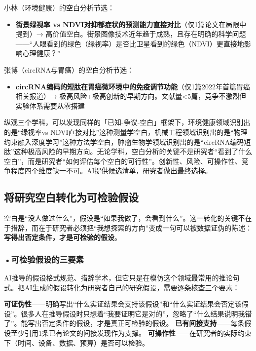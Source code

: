 小林（环境健康）的空白分析节选：

\begin{itemize}[nosep]
\item \textbf{街景绿视率 vs NDVI对抑郁症状的预测能力直接对比}（仅1篇论文在局限中提到）→ 高价值空白。街景图像技术近年趋于成熟，且存在明确的科学问题——``人眼看到的绿色（绿视率）是否比卫星看到的绿色（NDVI）更直接地影响心理健康？''
\end{itemize}

张博（circRNA与胃癌）的空白分析节选：

\begin{itemize}[nosep]
\item \textbf{circRNA编码的短肽在胃癌微环境中的免疫调节功能}（仅1篇2022年首篇胃癌相关报道）→ 极高风险+极高创新的早期方向。文献量<5篇，竞争不激烈但实验体系需要从零搭建
\end{itemize}

\smallskip
纵观三个学科，可以发现同样的「已知-争议-空白」框架下，环境健康领域识别出的是``绿视率vs NDVI直接对比''这种测量学空白，机械工程领域识别出的是``物理约束融入深度学习''这种方法学空白，肿瘤生物学领域识别出的是``circRNA编码短肽''这种极高风险的早期方向。无论学科，空白分析的关键不是研究者``看到了什么空白''，而是研究者``如何评估每个空白的可行性''。创新性、风险、可操作性、竞争程度四个维度缺一不可。AI提供候选清单，研究者做出最终选择。

\subsection{将研究空白转化为可检验假设}

空白是``没人做过什么''，假设是``如果我做了，会看到什么''。这一转化的关键不在于措辞，而在于研究者必须把``我想探索的方向''变成一句可以被数据证伪的陈述：\textbf{写得出否定条件，才是可检验的假设}。

\subsubsection*{\textbf{•可检验假设的三要素}}AI推导的假设格式规范、措辞学术，但它只是在模仿这个领域最常用的推论句式。把AI生成的假设转化为研究者自己的研究假设，需要逐条核查三个要素：

\textbf{可证伪性}——明确写出``什么实证结果会支持该假设''和``什么实证结果会否定该假设''。很多人在推导假设时只想着``我要证明它是对的''，忽略了``什么结果说明我错了''。能写出否定条件的假设，才是真正可检验的假设。
\textbf{已有间接支持}——每条假设至少引用1条已有论文的间接发现作为支撑。
\textbf{可操作性}——在研究者的实际约束下（时间、设备、数据、预算）是否可以检验。

